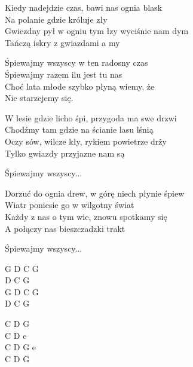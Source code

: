 \begin{text}
    Kiedy nadejdzie czas, bawi nas ognia blask\\
    Na polanie gdzie króluje zły\\
    Gwiezdny pył w ogniu tym łzy wyciśnie nam dym\\
    Tańczą iskry z gwiazdami a my

    \vin Śpiewajmy wszyscy w ten radosny czas\\
    \vin Śpiewajmy razem ilu jest tu nas\\
    \vin Choć lata młode szybko płyną wiemy, że\\
    \vin Nie starzejemy się.

    W lesie gdzie licho śpi, przygoda ma swe drzwi\\
    Chodźmy tam gdzie na ścianie lasu lśnią\\
    Oczy sów, wilcze kły, rykiem powietrze drży\\
    Tylko gwiazdy przyjazne nam są

    \vin Śpiewajmy wszyscy...

    Dorzuć do ognia drew, w górę niech płynie śpiew\\
    Wiatr poniesie go w wilgotny świat\\
    Każdy z nas o tym wie, znowu spotkamy się\\
    A połączy nas bieszczadzki trakt

    \vin Śpiewajmy wszyscy...
\end{text}
\begin{chord}
    G D C G\\
    D C G\\
    G D C G\\
    D C G

    C D G\\
    C D e\\
    C D G e\\
    C D G
\end{chord}